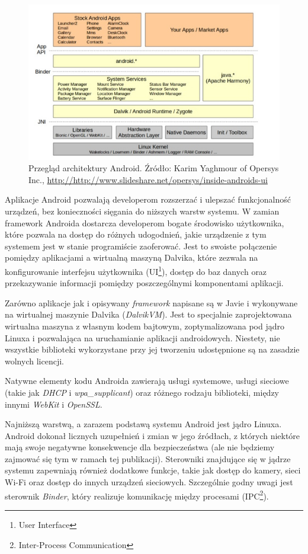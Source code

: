 \begin{figure}[!htb]
    \centering
    \includegraphics[width=15cm]{imgs/ch3_android_architecture_1.jpg}
    \caption
{Przegląd architektury Android. Źródło: Karim Yaghmour of Opersys Inc., \url{http://http://www.slideshare.net/opersys/inside-androids-ui}}
    \label{fig:ch3_android_architecture_1}
\end{figure} 

Aplikacje Android pozwalają developerom rozszerzać i ulepszać funkcjonalność urządzeń, bez konieczności sięgania do niższych warstw systemu. W zamian framework Androida dostarcza developerom bogate środowisko użytkownika, które pozwala na dostęp do różnych udogodnień, jakie urządzenie z tym systemem jest w stanie programiście zaoferować. Jest to swoiste połączenie pomiędzy aplikacjami a wirtualną maszyną Dalvika, które zezwala na konfigurowanie interfejsu użytkownika (UI\footnote{User Interface}), dostęp do baz danych oraz przekazywanie informacji pomiędzy poszczególnymi komponentami aplikacji.

Zarówno aplikacje jak i opisywany \textit{framework} napisane są w Javie i wykonywane na wirtualnej maszynie Dalvika (\textit{DalvikVM}). Jest to specjalnie zaprojektowana wirtualna maszyna z własnym kodem bajtowym, zoptymalizowana pod jądro Linuxa i pozwalająca na uruchamianie aplikacji androidowych. Niestety, nie wszystkie biblioteki wykorzystane przy jej tworzeniu udostępnione są na zasadzie wolnych licencji.

Natywne elementy kodu Androida zawierają usługi systemowe, usługi sieciowe (takie jak \textit{DHCP} i \textit{wpa\_supplicant}) oraz różnego rodzaju biblioteki, między innymi \textit{WebKit} i \textit{OpenSSL}. 

Najniższą warstwą, a zarazem podstawą systemu Android jest jądro Linuxa. Android dokonał licznych uzupełnień i zmian w jego źródłach, z których niektóre mają swoje negatywne konsekwencje dla bezpieczeństwa (ale nie będziemy zajmować się tym w ramach tej publikacji). Sterowniki znajdujące się w jądrze systemu zapewniają również dodatkowe funkcje, takie jak dostęp do kamery, sieci Wi-Fi oraz dostęp do innych urządzeń sieciowych. Szczególnie godny uwagi jest sterownik \textit{Binder}, który realizuje komunikację między procesami\cite{bib:hacker:handbook} (IPC\footnote{Inter-Process Communication}).

